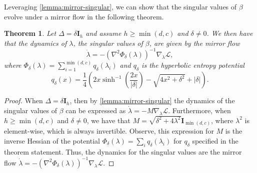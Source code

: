 \documentclass{article}
\theoremstyle{plain}
\newtheorem{theorem}{Theorem}[section]
\theoremstyle{definition}
\theoremstyle{remark}
\begin{document}
% 
Leveraging \cref{lemma:mirror-singular}, we can show that the singular values of $\beta$ evolve under a mirror flow in the following theorem.
\begin{theorem}
\label{thrm:multi-neuron-singular}
Let $\Delta = \delta \mathbf{I}_h$ and assume $h \geq \min(d, c)$ and $\delta \ne 0$. We then have that the dynamics of $\lambda$, the singular values of $\beta$, are given by the mirror flow
\begin{equation}
    \dot{\lambda} = -\left( \nabla^2 \Phi_\delta(\lambda) \right)^{-1} \nabla_{\lambda} \mathcal{L},
\end{equation}
where $\Phi_\delta(\lambda) = \sum_{i=1}^{\min(d, c)} q_\delta(\lambda_{i})$ and $q_\delta$ is the hyperbolic entropy potential
\begin{equation} 
q_\delta(x) = \frac{1}{4}\left(2x \sinh^{-1}\left(\frac{ 2x}{|\delta|}\right) - \sqrt{ 4x^2 + \delta^2} + |\delta|\right).
\end{equation}
\end{theorem}

\begin{proof}
    When $\Delta = \delta \mathbf{I}_h$, then by \cref{lemma:mirror-singular} the dynamics of the singular values of $\beta$ can be expressed as $\dot{\lambda} = -M \nabla_\lambda \mathcal{L}$.
    Furthermore, when $h \geq \min(d, c)$ and $\delta \ne 0$, we have that $M = \sqrt{\delta^2 + 4\lambda^2}\mathbf{I}_{\min(d,c)}$, where $\lambda^2$ is element-wise, which is always invertible.
    Observe, this expression for $M$ is the inverse Hessian of the potential $\Phi_\delta(\lambda) = \sum_i q_\delta(\lambda_{i})$ for $q_\delta$ specified in the theorem statement.
    Thus, the dynamics for the singular values are the mirror flow $\dot{\lambda} = -\left( \nabla^2 \Phi_\delta(\lambda) \right)^{-1}\nabla_\lambda \mathcal{L}$.
\end{proof}
\end{document}
